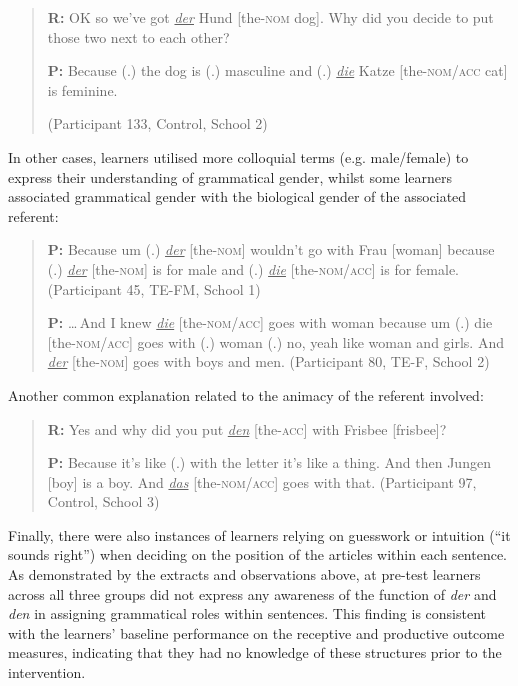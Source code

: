 \documentclass[output=paper]{langscibook}
\begin{document}
\begin{quote}
  \textbf{R:} OK so we’ve got \textit{\ul{der}} Hund [the-\textsc{nom} dog]. Why did you   decide to put those two next to each other?

  \textbf{P:} Because (.) the dog is (.) masculine and (.) \textit{\ul{die}} Katze [the-\textsc{nom/acc} cat] is feminine. 

(Participant 133, Control, School 2)
\end{quote}

In other cases, learners utilised more colloquial terms (e.g. male/female) to express their understanding of grammatical gender, whilst some learners associated grammatical gender with the biological gender of the associated referent:

\begin{quote}
  \textbf{P:} Because um (.) \textit{\ul{der}} [the-\textsc{nom}] wouldn’t go with Frau   [woman] because (.) \textit{\ul{der}} [the-\textsc{nom}] is for male and (.) \textit{\ul{die}} [the-\textsc{nom/acc}] is for female. (Participant 45, TE-FM, School 1)

  \textbf{P:} \ldots\,And I knew \textit{\ul{die}} [the-\textsc{nom/acc}] goes with woman   because um (.) die [the-\textsc{nom/acc}] goes with (.) woman (.) no,   yeah like woman and girls. And \textit{\ul{der}} [the-\textsc{nom}] goes with boys   and men. (Participant 80, TE-F, School 2)
\end{quote}

Another common explanation related to the animacy of the referent involved:

\begin{quote}
   \textbf{R:} Yes and why did you put \textit{\ul{den}} [the-\textsc{acc}] with Frisbee   [frisbee]?

  \textbf{P:} Because it’s like (.) with the letter it’s like a thing. And then   Jungen [boy] is a boy. And \textit{\ul{das}} [the-\textsc{nom/acc}] goes with   that. (Participant 97, Control, School 3)
\end{quote}

Finally, there were also instances of learners relying on guesswork or intuition (“it sounds right”) when deciding on the position of the articles within each sentence. As demonstrated by the extracts and observations above, at pre-test learners across all three groups did not express any awareness of the function of \textit{der} and \textit{den} in assigning grammatical roles within sentences. This finding is consistent with the learners’ baseline performance on the receptive and productive outcome measures, indicating that they had no knowledge of these structures prior to the intervention. 
\end{document}
